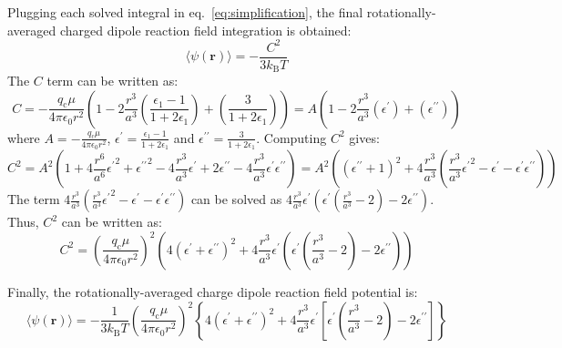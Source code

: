 \documentclass[11pt,oneside,a4paper]{article}
\begin{document}
Plugging each solved integral in eq.~\ref{eq:simplification}, the final rotationally-averaged charged dipole reaction field integration is obtained:
\begin{equation}
 \label{eq:avgrot}
 \langle \psi(\mathbf{r}) \rangle  = -\frac{C^2}{3k_\mathrm{B}T}
\end{equation}
The $C$ term can be written as:
\begin{equation}
 \label{eq:cterm}
 C = -\frac{q_\mathrm{c}\mu}{4\pi\epsilon_0 r^2} \left ( 1 - 2\frac{r^3}{a^3}\left (\frac{\epsilon_1 -1}{1+2\epsilon_1} \right ) + \left (\frac{3}{1+2\epsilon_1} \right ) \right ) = A\left ( 1 - 2\frac{r^3}{a^3}\left ( \epsilon^\prime \right ) + \left (\epsilon^{\prime\prime} \right )    \right ) 
\end{equation}
where $A =-\frac{q_\mathrm{c}\mu}{4\pi\epsilon_0 r^2}$, $\epsilon^\prime = \frac{\epsilon_1 -1}{1+2\epsilon_1}$ and $\epsilon^{\prime\prime} = \frac{3}{1+2\epsilon_1}$. 
Computing $C^2$ gives:
\begin{equation}
 \label{eq:csquared}
 C^2 = A^2\left ( 1 + 4\frac{r^6}{a^6}{\epsilon^\prime}^2 + {\epsilon^{\prime\prime}}^2 - 4\frac{r^3}{a^3}\epsilon^\prime + 2\epsilon^{\prime\prime} - 4\frac{r^3}{a^3}\epsilon^\prime \epsilon^{\prime\prime} \right ) = A^2 \left(\left (\epsilon^{\prime\prime} + 1 \right)^2 + 4\frac{r^3}{a^3}\left ( \frac{r^3}{a^3}{\epsilon^\prime}^2 - \epsilon^\prime - \epsilon^\prime \epsilon^{\prime\prime} \right ) \right )
\end{equation}
The term $4\frac{r^3}{a^3}\left ( \frac{r^3}{a^3}{\epsilon^\prime}^2 - \epsilon^{\prime} - \epsilon^\prime \epsilon^{\prime\prime} \right ) $ can be solved as $4\frac{r^3}{a^3}\epsilon^\prime\left ( \epsilon^\prime \left (\frac{r^3}{a^3} - 2 \right ) -2\epsilon^{\prime\prime} \right ) $.
Thus, $C^2$ can be written as:
\begin{equation}
\label{eq:cterm2}
C^2 = \left (\frac{q_\mathrm{c}\mu}{4\pi\epsilon_0 r^2} \right )^2 \left( 4(\epsilon^\prime + \epsilon^{\prime\prime})^2 + 4\frac{r^3}{a^3}\epsilon^\prime \left( \epsilon^\prime \left (\frac{r^3}{a^3} - 2 \right ) -2\epsilon^{\prime\prime} \right) \right ) 
\end{equation}

Finally, the rotationally-averaged charge dipole reaction field potential is:
\begin{equation}
 \label{eq:rotavgpot}
 \langle \psi(\mathbf{r}) \rangle = -\frac{1}{3k_\mathrm{B}T} \left ( \frac{q_\mathrm{c}\mu}{4\pi\epsilon_0 r^2} \right )^2 \left \{ 4(\epsilon^\prime + \epsilon^{\prime\prime})^2 + 4\frac{r^3}{a^3}\epsilon^\prime \left[ \epsilon^\prime \left (\frac{r^3}{a^3} - 2 \right ) -2\epsilon^{\prime\prime} \right ] \right \}
\end{equation}












{}
\end{document}
